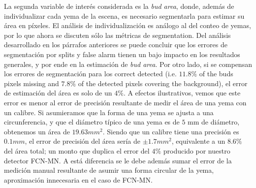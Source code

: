 \documentclass[a4paper,authoryear,review]{elsarticle}
\begin{document}
%
La segunda variable de interés considerada es la \emph{bud area}, donde, además de individualizar cada yema de la escena, es necesario segmentarla para estimar su área en píxeles. El análisis de individualización es análogo al del conteo de yemas, por lo que ahora se discuten sólo las métricas de segmentation. Del análisis desarrollado en los párrafos anteriores se puede concluir que los errores de segmentación por splits y false alarm tienen un bajo impacto en los resultados generales, y por ende en la estimación de \emph{bud area}. Por otro lado, si se compensan los errores de segmentación para los correct detected (i.e. $11.8\%$ of the buds pixels missing and $7.8\%$ of the detected pixels covering the background), el error de estimación del área es solo de un $4\%$. A efectos ilustrativos, vemos que este error es menor al error de precisión resultante de medir el área de una yema con un calibre. Si asumieramos que la forma de una yema se ajusta a una circunferencia, y que el diámetro típico de una yema es de $5$ mm de diámetro, obtenemos un área de $19.63 mm^2$. Siendo que un calibre tiene una precisión es $0.1 mm$, el error de precisión del área sería de $\pm 1.7 mm^2$, equivalente a un $8.6\%$ del área total; un monto que duplica el error del $4\%$ producido por nuestro detector FCN-MN. A está diferencia se le debe además sumar el error de la medición manual resultante de asumir una forma circular de la yema, aproximación innecesaria en el caso de FCN-MN.
%


\end{document}
